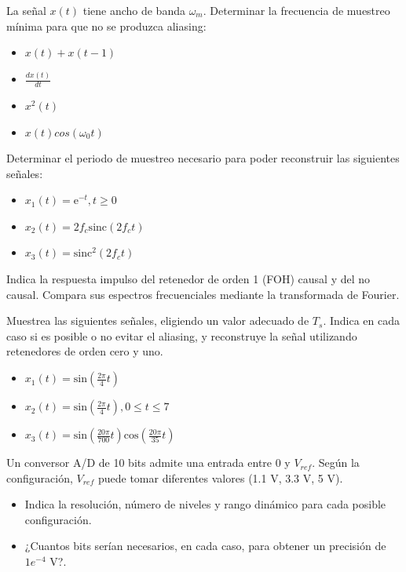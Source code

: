 \documentclass[10pt,twoside,spanish,a4paper]{article}
\begin{document}
\vspace{-8em}

	\begin{itemize}
		\itemP La señal $x(t)$ tiene ancho de banda $\omega_m$. Determinar la frecuencia de muestreo mínima para que no se produzca aliasing:
		\begin{itemize}
			\item $x(t) + x(t-1)$
			\item $\frac{dx(t)}{dt}$
			\item $x^2(t)$
			\item $x(t)cos(\omega_0 t)$
		\end{itemize}

		\itemP Determinar el periodo de muestreo necesario para poder reconstruir las siguientes señales:
		\begin{itemize}
			\item $x_1(t)=\mathrm{e}^{-t}, t \geq 0$
			\item $x_2(t)=2f_c\mathrm{sinc}(2f_c t)$
			\item $x_3(t)=\mathrm{sinc}^2(2f_c t)$
		\end{itemize}

		\itemP Indica la respuesta impulso del retenedor de orden 1 (FOH) causal y del no causal. Compara sus espectros frecuenciales mediante
		la transformada de Fourier.

		\itemP Muestrea las siguientes señales, eligiendo un valor adecuado de $T_s$. Indica en cada caso si es posible o no 
		evitar el aliasing, y reconstruye la señal utilizando retenedores de orden cero y uno.
		\begin{itemize}
			\item $x_1(t)=\mathrm{sin}(\frac{2\pi}{4} t)$
			\item $x_2(t)=\mathrm{sin}(\frac{2\pi}{4} t), 0\leq t\leq 7$
			\item $x_3(t)=\mathrm{sin}(\frac{20\pi}{700}t)\mathrm{cos}(\frac{20\pi}{35}t)$
		\end{itemize}

		\itemP Un conversor A/D de 10 bits admite una entrada entre 0 y $V_{ref}$. Según la configuración, $V_{ref}$ puede tomar diferentes valores (1.1 V, 3.3 V, 5 V).
		\begin{itemize}
			\item Indica la resolución, número de niveles y rango dinámico para cada posible configuración.
			\item ¿Cuantos bits serían necesarios, en cada caso, para obtener un precisión de $1e^{-4}$ V?.
		\end{itemize}

	\end{itemize}
\end{document}
